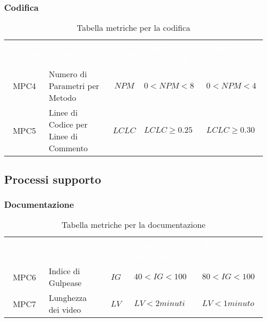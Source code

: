 \subsubsection{Codifica}  
     \renewcommand{\arraystretch}{1.5}
     \begin{longtable}{ c C{4cm} c C{3.5cm} C{3.5cm}}
     	\caption{Tabella metriche per la codifica}\\
     	\textcolor{white}{\textbf{Metrica}} & \textcolor{white}{\textbf{Nome}} & \textcolor{white}{\textbf{Sigla}} & \textcolor{white}{\textbf{Range Accettabile}} & \textcolor{white}{\textbf{Range Ottimale}}\\
		MPC4 & Numero di Parametri per Metodo & $NPM$ & $0 < NPM < 8$ & $ 0 < NPM < 4$ \\
		MPC5 & Linee di Codice per Linee di Commento & $LCLC$ & $LCLC \geq 0.25$ & $LCLC \geq 0.30$ \\
	\end{longtable}

\newpage
\subsection{Processi supporto}

\subsubsection{Documentazione}
    \renewcommand{\arraystretch}{1.5}
    \begin{longtable}{ c C{4cm} c C{3.5cm} C{3.5cm}}
    	\caption{Tabella metriche per la documentazione}\\
    	\textcolor{white}{\textbf{Metrica}} & \textcolor{white}{\textbf{Nome}} & \textcolor{white}{\textbf{Sigla}} & \textcolor{white}{\textbf{Range Accettabile}} & \textcolor{white}{\textbf{Range Ottimale}}\\
    	MPC6 & Indice di Gulpease & $IG$ & $40 < IG < 100$ & $80 < IG < 100$ \\
    	MPC7 & Lunghezza dei video & $LV$ & $LV < 2 minuti$ & $LV < 1 minuto$ \\
    \end{longtable}
\vspace{0.3cm}
